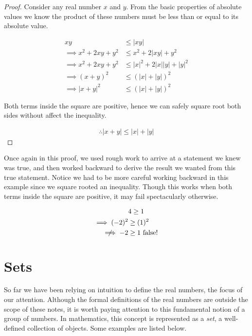 \documentclass[twoside]{report}
\begin{document}
\begin{proof}
	Consider any real number $x$ and $y$. From the basic properties of absolute values we know the product of these numbers must be less than or equal to its absolute value.
	
	\begin{align*}
		xy &\le |xy| \\
		\implies x^2 + 2xy + y^2 &\le x^2 + 2|xy| + y^2 \\
		\implies x^2 + 2xy + y^2 &\le |x|^2 + 2|x||y| + |y|^2 \\
		\implies (x + y)^2 &\le (|x| + |y|)^2 \\
		\implies |x + y|^2 &\le (|x| + |y|)^2
	\end{align*}
	
	Both terms inside the square are positive, hence we can safely square root both sides without affect the inequality.
	
	\begin{align*}
		\therefore |x + y| \le |x| + |y|
	\end{align*}
\end{proof}
\vspace{\baselineskip}

Once again in this proof, we used rough work to arrive at a statement we knew was true, and then worked backward to derive the result we wanted from this true statement. Notice we had to be more careful working backward in this example since we square rooted an inequality. Though this works when both terms inside the square are positive, it may fail spectacularly otherwise.

\begin{align*}
	&4 \ge 1 \\
	\implies (-2)^2 &\ge (1)^2 \\
	\centernot\implies -2 &\ge 1 \text{ false!}
\end{align*}

\section{Sets}
So far we have been relying on intuition to define the real numbers, the focus of our attention. Although the formal definitions of the real numbers are outside the scope of these notes, it is worth paying attention to this fundamental notion of a group of numbers. In mathematics, this concept is represented as a \emph{set},  a well-defined collection of objects. Some examples are listed below.
\end{document}
